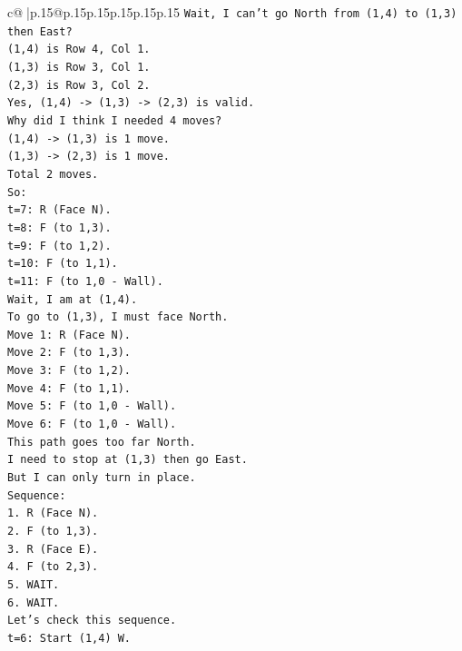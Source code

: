 \documentclass{article}
\begin{document}
{\begin{supertabular}{c@{$\;$}|p{.15\linewidth}@{}p{.15\linewidth}p{.15\linewidth}p{.15\linewidth}p{.15\linewidth}p{.15\linewidth}}
{{{\texttt{Wait, I can't go North from (1,4) to (1,3) then East?} \\
\texttt{(1,4) is Row 4, Col 1.} \\
\texttt{(1,3) is Row 3, Col 1.} \\
\texttt{(2,3) is Row 3, Col 2.} \\
\texttt{Yes, (1,4) {-}> (1,3) {-}> (2,3) is valid.} \\
\texttt{Why did I think I needed 4 moves?} \\
\texttt{(1,4) {-}> (1,3) is 1 move.} \\
\texttt{(1,3) {-}> (2,3) is 1 move.} \\
\texttt{Total 2 moves.} \\
\texttt{So:} \\
\texttt{t=7: R (Face N).} \\
\texttt{t=8: F (to 1,3).} \\
\texttt{t=9: F (to 1,2).} \\
\texttt{t=10: F (to 1,1).} \\
\texttt{t=11: F (to 1,0 {-} Wall).} \\
\texttt{Wait, I am at (1,4).} \\
\texttt{To go to (1,3), I must face North.} \\
\texttt{Move 1: R (Face N).} \\
\texttt{Move 2: F (to 1,3).} \\
\texttt{Move 3: F (to 1,2).} \\
\texttt{Move 4: F (to 1,1).} \\
\texttt{Move 5: F (to 1,0 {-} Wall).} \\
\texttt{Move 6: F (to 1,0 {-} Wall).} \\
\texttt{This path goes too far North.} \\
\texttt{I need to stop at (1,3) then go East.} \\
\texttt{But I can only turn in place.} \\
\texttt{Sequence:} \\
\texttt{1. R (Face N).} \\
\texttt{2. F (to 1,3).} \\
\texttt{3. R (Face E).} \\
\texttt{4. F (to 2,3).} \\
\texttt{5. WAIT.} \\
\texttt{6. WAIT.} \\
\texttt{Let's check this sequence.} \\
\texttt{t=6: Start (1,4) W.} \\
}}}
\end{supertabular}}
\end{document}
